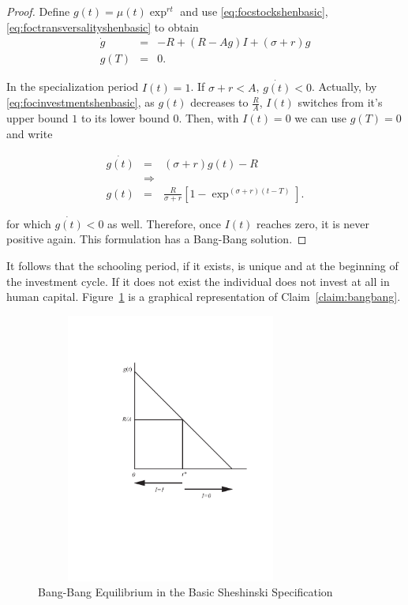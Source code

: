 \begin{proof}
Define $g(t) = \mu(t) \exp^{rt}$ and use \eqref{eq:focstockshenbasic}, \eqref{eq:foctransversalityshenbasic} to obtain
\begin{eqnarray}
\dot{g} &=& -R + (R - Ag)I + (\sigma + r)g \label{eq:gbasicshen} \\ 
g(T) &=& 0.
\end{eqnarray}

\indent In the specialization period $I(t) = 1$. If $\sigma + r < A$, $\dot{g(t)}<0$. Actually, by \eqref{eq:focinvestmentshenbasic}, as $g(t)$ decreases to $\frac{R}{A}$, $I(t)$ switches from it's upper bound $1$ to its lower bound $0$. Then, with $I(t) = 0$ we can use $g(T) = 0$ and write

\begin{eqnarray}
\dot{g(t)} &=& (\sigma + r)g(t) - R \nonumber \\
&\Rightarrow& \nonumber \\ 
g(t) &=& \frac{R}{\sigma + r} \left[1 - \exp^{(\sigma + r)(t-T)} \right] \label{eq:gshenbasei0}.
\end{eqnarray}

\noindent for which $\dot{g(t)}<0$ as well. Therefore, once $I(t)$ reaches zero, it is never positive again. This formulation has a Bang-Bang solution.
\end{proof}

\indent It follows that the schooling period, if it exists, is unique and at the beginning of the investment cycle. If it does not exist the individual does not invest at all in human capital. Figure~\ref{fig:bangbang} is a graphical representation of Claim~\ref{claim:bangbang}. 

\begin{center}
\begin{figure}[H]
\caption{Bang-Bang Equilibrium in the Basic Sheshinski Specification} \label{fig:bangbang}
\centering
\includegraphics[width=3.5in, height=3.5in]{Figures/fig-shesh-rule.pdf}
\end{figure}
\end{center}

